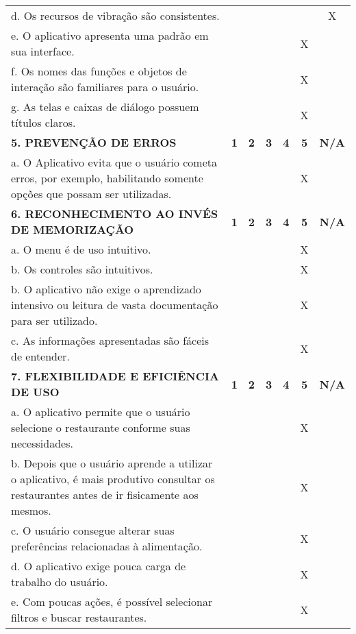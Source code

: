 \documentclass[portuguese,oneside]{tcc}
\begin{document}
\begin{table}[h]
{\begin{tabu}{|L{25em}|c|c|c|c|c|c|}
							d. Os recursos de vibração são consistentes. & & & & & & X \\ 
							e. O aplicativo apresenta uma padrão em sua interface. & & & & & X & \\ 
							f. Os nomes das funções e objetos de interação são familiares para o usuário. & & & & & X & \\ 
							g. As telas e caixas de diálogo possuem títulos claros. & & & & & X & \\ 
							\textbf{5. PREVENÇÃO DE ERROS} & \textbf{1} & \textbf{2} & \textbf{3} & \textbf{4} & \textbf{5} & \textbf{N/A} \\ 
							a. O Aplicativo evita que o usuário cometa erros, por exemplo, habilitando somente opções que possam ser utilizadas. & & & & & X & \\ 
							\textbf{6. RECONHECIMENTO AO INVÉS DE MEMORIZAÇÃO} & \textbf{1} & \textbf{2} & \textbf{3} & \textbf{4} & \textbf{5} & \textbf{N/A} \\ 
							a. O  menu é de uso intuitivo. & & & & & X & \\ 
							b. Os controles são intuitivos. & & & & & X & \\ 
							b. O aplicativo não exige o aprendizado intensivo ou leitura de vasta documentação para ser utilizado. & & & & & X & \\ 
							c. As informações apresentadas são fáceis de entender. & & & & & X & \\ 
							\textbf{7. FLEXIBILIDADE E EFICIÊNCIA DE USO} & \textbf{1} & \textbf{2} & \textbf{3} & \textbf{4} & \textbf{5} & \textbf{N/A} \\ 
							a. O aplicativo permite que o usuário selecione o restaurante conforme suas necessidades. & & & & & X & \\ 
							b. Depois que o usuário aprende a utilizar o aplicativo, é mais produtivo consultar os restaurantes antes de ir fisicamente aos mesmos. & & & & & X & \\ 
							c. O usuário consegue alterar suas preferências relacionadas à alimentação. & & & & & X & \\ 
							d. O aplicativo exige pouca carga de trabalho do usuário. & & & & & X & \\ 
							e. Com poucas ações, é possível selecionar filtros e buscar restaurantes. & & & & & X & \\ 

\end{tabu}}
\end{table}
\end{document}
